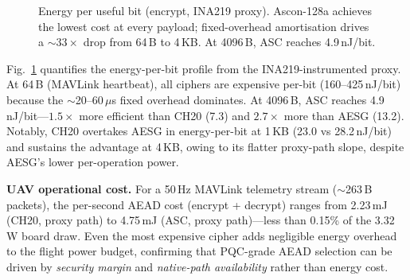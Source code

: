 \begin{figure}[t]
\centering
{}
\caption{Energy per useful bit (encrypt, INA219 proxy).  Ascon-128a
  achieves the lowest cost at every payload; fixed-overhead
  amortisation drives a ${\sim}33\times$ drop from 64\,B to
  4\,KB.  At 4096\,B, ASC reaches 4.9\,nJ/bit.}
\label{fig:aead_ebit}
\end{figure}

Fig.~\ref{fig:aead_ebit} quantifies the energy-per-bit profile from
the INA219-instrumented proxy.
At 64\,B (MAVLink heartbeat), all ciphers are expensive per-bit
(160--425\,nJ/bit) because the ${\sim}$20--60\,$\mu$s fixed overhead
dominates.
At 4096\,B, ASC reaches 4.9\,nJ/bit---$1.5\times$ more efficient
than CH20 (7.3) and $2.7\times$ more than AESG (13.2).
Notably, CH20 overtakes AESG in energy-per-bit at 1\,KB
(23.0 vs 28.2\,nJ/bit) and sustains the advantage at 4\,KB, owing
to its flatter proxy-path slope, despite AESG's lower per-operation
power.

\smallskip\noindent\textbf{UAV operational cost.}\enspace
For a 50\,Hz MAVLink telemetry stream (${\sim}$263\,B packets), the
per-second AEAD cost (encrypt + decrypt) ranges from 2.23\,mJ (CH20,
proxy path) to 4.75\,mJ (ASC, proxy path)---less than 0.15\% of the
3.32\,W board draw.
Even the most expensive cipher adds negligible energy overhead to the
flight power budget, confirming that PQC-grade AEAD selection can be
driven by \emph{security margin} and \emph{native-path availability}
rather than energy cost.

